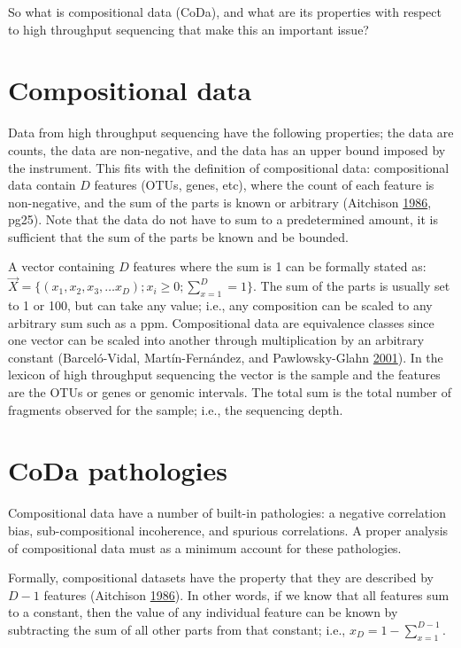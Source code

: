 \documentclass[onecolumn]{book}
\theoremstyle{definition}
\theoremstyle{definition}
\theoremstyle{definition}
\theoremstyle{remark}
\begin{document}
So what is compositional data (CoDa), and what are its properties with
respect to high throughput sequencing that make this an important issue?

\hypertarget{compositional-data}{%
\section{Compositional data}\label{compositional-data}}

Data from high throughput sequencing have the following properties; the
data are counts, the data are non-negative, and the data has an upper
bound imposed by the instrument. This fits with the definition of
compositional data: compositional data contain \(D\) features (OTUs,
genes, etc), where the count of each feature is non-negative, and the
sum of the parts is known or arbitrary (Aitchison
\protect\hyperlink{ref-Aitchison:1986}{1986}, pg25). Note that the data
do not have to sum to a predetermined amount, it is sufficient that the
sum of the parts be known and be bounded.

A vector containing \(D\) features where the sum is 1 can be formally
stated as:
\(\vec{X} = \{(x_1,x_2,x_3, \ldots x_D); x_i\ge 0; \sum_{x=1}^{D} = 1\}\).
The sum of the parts is usually set to 1 or 100, but can take any value;
i.e., any composition can be scaled to any arbitrary sum such as a ppm.
Compositional data are equivalence classes since one vector can be
scaled into another through multiplication by an arbitrary constant
(Barceló-Vidal, Martín-Fernández, and Pawlowsky-Glahn
\protect\hyperlink{ref-barcelo:2001}{2001}). In the lexicon of high
throughput sequencing the vector is the sample and the features are the
OTUs or genes or genomic intervals. The total sum is the total number of
fragments observed for the sample; i.e., the sequencing depth.

\hypertarget{coda-pathologies}{%
\section{CoDa pathologies}\label{coda-pathologies}}

Compositional data have a number of built-in pathologies: a negative
correlation bias, sub-compositional incoherence, and spurious
correlations. A proper analysis of compositional data must as a minimum
account for these pathologies.

Formally, compositional datasets have the property that they are
described by \(D-1\) features (Aitchison
\protect\hyperlink{ref-Aitchison:1986}{1986}). In other words, if we
know that all features sum to a constant, then the value of any
individual feature can be known by subtracting the sum of all other
parts from that constant; i.e., \(x_D = 1-\sum_{x=1}^{D-1}\).
\end{document}
